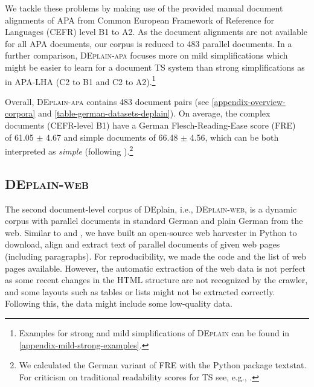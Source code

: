 \documentclass[11pt]{article}
\begin{document}
We tackle these problems by making use of the provided manual document alignments of APA from Common European Framework of Reference for Languages (CEFR) level B1 to A2. As the document alignments are not available for all APA documents, our corpus is reduced to 483 parallel documents. In a further comparison, \textsc{DEplain-apa} focuses more on mild simplifications which might be easier to learn for a document TS system than strong simplifications as in APA-LHA (C2 to B1 and C2 to A2).\footnote{Examples for strong and mild simplifications of \textsc{DEplain} can be found in \autoref{appendix-mild-strong-examples}.}

Overall, \textsc{DEplain-apa} contains 483 document pairs (see \autoref{appendix-overview-corpora} and \autoref{table-german-datasets-deplain}). On average, the complex documents (CEFR-level B1) have a German Flesch-Reading-Ease score (FRE)~\cite{flesch-1948-new,amstad-1978-verstandlich} of 61.05 $\pm$ 4.67 and simple documents of 66.48 $\pm$ 4.56, which can be both interpreted as \textit{simple} (following \citet[p. 117]{amstad-1978-verstandlich}).\footnote{We calculated the German variant of FRE with the Python package textstat.  For criticism on traditional readability scores for TS see, e.g., \citet{tanprasert-kauchak-2021-flesch}.}



\subsection{\textsc{DEplain-web}}
\label{sec-deplain-web}
The second document-level corpus of DEplain, i.e., \textsc{DEplain-web}, is a dynamic corpus with parallel documents in standard German and plain German from the web. Similar to \citet{battisti-etal-2020-corpus} and \citet{toborek-etal-2022-new}, we have built an open-source web harvester in Python to download, align and extract text of parallel documents of given web pages (including paragraphs). For reproducibility, we made the code and the list of web pages available.
However, the automatic extraction of the web data is not perfect as some recent changes in the HTML structure are not recognized by the crawler, and some layouts such as tables or lists might not be extracted correctly. Following this, the data might include some low-quality data.\par
\end{document}
